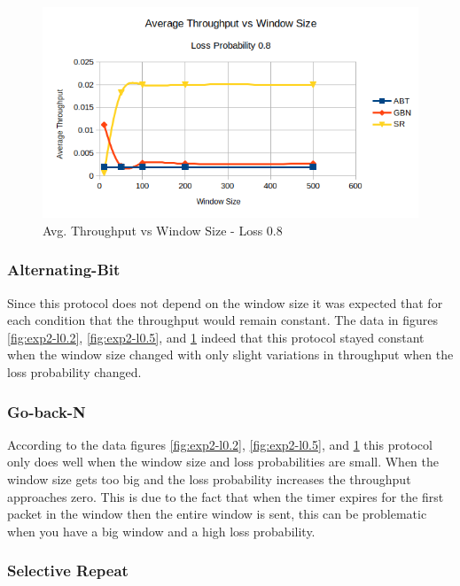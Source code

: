 \documentclass[10pt, a4paper]{article}
\begin{document}
    \begin{figure}[H]
        \includegraphics[width=\textwidth]{exp2-l08.png}
        \centering
        \caption{Avg. Throughput vs Window Size - Loss 0.8 }
        \label{fig:exp2-l0.8}
    \end{figure}
    
    \subsubsection{Alternating-Bit}
    
    
        Since this protocol does not depend on the window size it was expected that for each condition that the throughput would remain constant. The data in figures \ref{fig:exp2-l0.2}, \ref{fig:exp2-l0.5}, and \ref{fig:exp2-l0.8} indeed that this protocol stayed constant when the window size changed with only slight variations in throughput when the loss probability changed. 
        
      
    \subsubsection{Go-back-N}
    
        According to the data figures \ref{fig:exp2-l0.2}, \ref{fig:exp2-l0.5}, and \ref{fig:exp2-l0.8} this protocol only does well when the window size and loss probabilities are small. When the window size gets too big and the loss probability increases the throughput approaches zero. This is due to the fact that when the timer expires for the first packet in the window then the entire window is sent, this can be problematic when you have a big window and a high loss probability.  
        
        
    \subsubsection{Selective Repeat}
    
\end{document}
